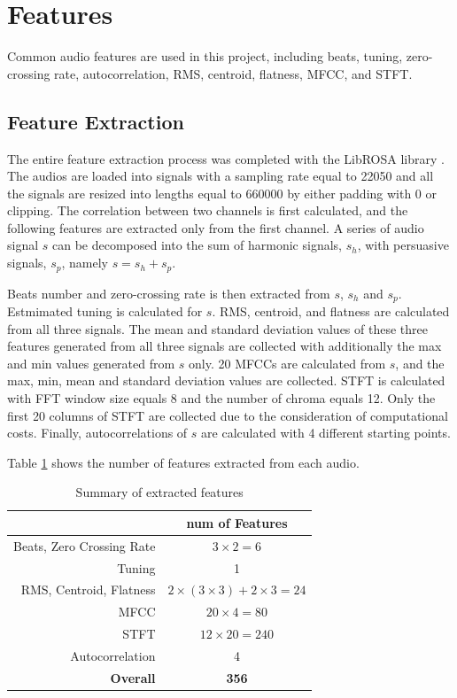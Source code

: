 \documentclass[sigconf ,nonacm]{acmart}
\begin{document}
\section{Features}
Common audio features are used in this project, including beats, tuning, zero-crossing rate, autocorrelation, RMS, centroid, flatness, MFCC, and STFT.

\subsection{Feature Extraction}
The entire feature extraction process was completed with the LibROSA library \cite{brian_mcfee_2022_6097378}. The audios are loaded into signals with a sampling rate equal to 22050 and all the signals are resized into lengths equal to 660000 by either padding with 0 or clipping. The correlation between two channels is first calculated, and the following features are extracted only from the first channel. A series of audio signal $s$ can be decomposed into the sum of harmonic signals, $s_h$, with persuasive signals, $s_p$, namely $s = s_h+s_p$. 

Beats number and zero-crossing rate is then extracted from $s$, $s_h$ and $s_p$. Estmimated tuning is calculated for $s$. RMS, centroid, and flatness are calculated from all three signals. The mean and standard deviation values of these three features generated from all three signals are collected with additionally the max and min values generated from $s$ only. 20 MFCCs are calculated from $s$, and the max, min, mean and standard deviation values are collected. STFT is calculated with FFT window size equals 8 and the number of chroma equals 12. Only the first 20 columns of STFT are collected due to the consideration of computational costs. Finally, autocorrelations of $s$ are calculated with 4 different starting points. 

Table \ref{tabel:feature size} shows the number of features extracted from each audio.

\begin{table}[]
\begin{tabular}{r|c}
       & num of Features \\ \hline
Beats, Zero Crossing Rate  & $3\times2 = 6$ \\
Tuning & 1 \\
RMS, Centroid, Flatness & $2\times(3\times 3) +2\times 3 = 24 $ \\
MFCC & $20\times4 = 80$ \\
STFT & $12\times20 = 240$ \\
Autocorrelation & 4\\
\textbf{Overall} & \textbf{356}
\end{tabular}
\caption{Summary of extracted features}
\label{tabel:feature size}
\end{table}
\end{document}

